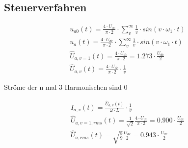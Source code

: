 \columnbreak
\subsection{Steuerverfahren}
\begin{gather*}
u_{a0}(t) = \frac{4 \cdot U_{dc}}{\pi \cdot 2} \cdot \sum_v^\infty \frac{1}{v} \cdot sin(v \cdot \omega_1 \cdot t) \\
u_a(t) = \frac{4 \cdot U_{dc}}{\pi \cdot 2} \cdot \sum_v^\infty \frac{1}{v} \cdot sin(v \cdot \omega_1 \cdot t) \\
\hat{U}_{a,v=1}(t) = \frac{4 \cdot U_{dc}}{\pi \cdot 2} = 1.273 \cdot \frac{U_{dc}}{2} \\
\hat{U}_{a,v}(t) = \frac{4 \cdot U_{dc}}{\pi \cdot 2} \cdot \frac{1}{v}
\end{gather*}
\begin{achtung}
Ströme der n mal 3 Harmonischen sind 0
\end{achtung}
\begin{gather*}
\hat{I}_{a,v}(t) = \frac{\hat{U}_{a,v}(t)}{\omega \cdot L} \cdot \frac{1}{v} \\
\hat{U}_{a,v=1,rms}(t) = \frac{1}{\sqrt{2}} \frac{4 \cdot U_{dc}}{\pi \cdot 2} = 0.900 \cdot \frac{U_{dc}}{2} \\
\hat{U}_{a,rms}(t) = \sqrt{\frac{8}{9}} \frac{U_{dc}}{2} = 0.943 \cdot \frac{U_{dc}}{2}
\end{gather*}

\columnbreak
